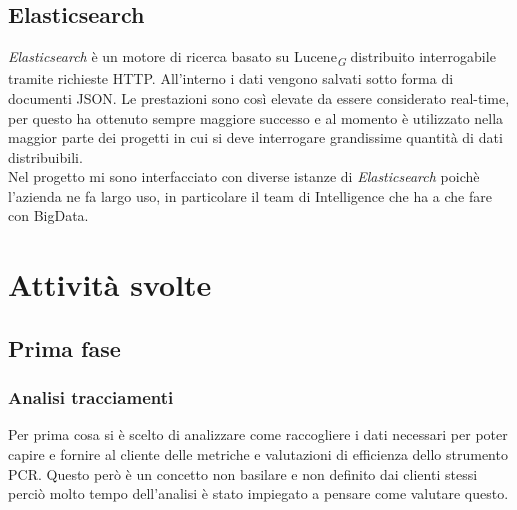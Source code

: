\documentclass[a4paper, 12pt, twoside, openright]{book}
\newcommand{\gloss}[1]{#1\textsubscript{\textit{\tiny{G}}}}
\begin{document}
\subsection{Elasticsearch}
\textit{Elasticsearch} è un motore di ricerca basato su \gloss{Lucene} distribuito interrogabile tramite richieste HTTP. All'interno i dati vengono salvati sotto forma di documenti JSON. Le prestazioni sono così elevate da essere considerato real-time, per questo ha ottenuto sempre maggiore successo e al momento è utilizzato nella maggior parte dei progetti in cui si deve interrogare grandissime quantità di dati distribuibili.\\
Nel progetto mi sono interfacciato con diverse istanze di \textit{Elasticsearch} poichè l'azienda ne fa largo uso, in particolare il team di Intelligence che ha a che fare con BigData.

\newpage{}
\section{Attività svolte}

\subsection{Prima fase}

\subsubsection{Analisi tracciamenti}
\label{analisi-pcr}
Per prima cosa si è scelto di analizzare come raccogliere i dati necessari per poter capire e fornire al cliente delle metriche e valutazioni di efficienza dello strumento PCR. Questo però è un concetto non basilare e non definito dai clienti stessi perciò molto tempo dell'analisi è stato impiegato a pensare come valutare questo.\\
\end{document}
